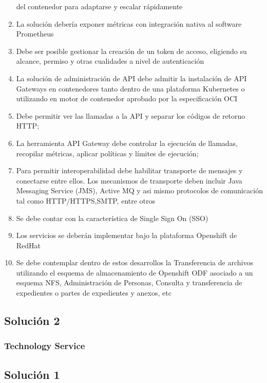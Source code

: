 \documentclass[
  paper=a4,
  ,captions=tableheading
]{scrartcl}
\begin{document}
\begin{enumerate}
  del contenedor para adaptarse y escalar rápidamente
\item
  La solución debería exponer métricas con integración nativa al
  software Prometheus
\item
  Debe ser posible gestionar la creación de un token de acceso,
  eligiendo su alcance, permiso y otras cualidades a nivel de
  autenticación
\item
  La solución de administración de API debe admitir la instalación de
  API Gateways en contenedores tanto dentro de una plataforma Kubernetes
  o utilizando en motor de contenedor aprobado por la especificación OCI
\item
  Debe permitir ver las llamadas a la API y separar los códigos de
  retorno HTTP;
\item
  La herramienta API Gateway debe controlar la ejecución de llamadas,
  recopilar métricas, aplicar políticas y límites de ejecución;
\item
  Para permitir interoperabilidad debe habilitar transporte de mensajes
  y conectarse entre ellos. Los mecanismos de transporte deben incluir
  Java Messaging Service (JMS), Active MQ y asi mismo protocolos de
  comunicación tal como HTTP/HTTPS,SMTP, entre otros
\item
  Se debe contar con la característica de Single Sign On (SSO)
\item
  Los servicios se deberán implementar bajo la plataforma Openshift de
  RedHat
\item
  Se debe contemplar dentro de estos desarrollos la Transferencia de
  archivos utilizando el esquema de almacenamiento de Openshift ODF
  asociado a un esquema NFS, Administración de Personas, Consulta y
  transferencia de expedientes o partes de expedientes y anexos, etc
\end{enumerate}

\hypertarget{soluciuxf3n-2}{%
\subsection{Solución 2}\label{soluciuxf3n-2}}

\hypertarget{technology-service}{%
\subsubsection{Technology Service}\label{technology-service}}

\hypertarget{soluciuxf3n-1}{%
\subsection{Solución 1}\label{soluciuxf3n-1}}
\end{document}
